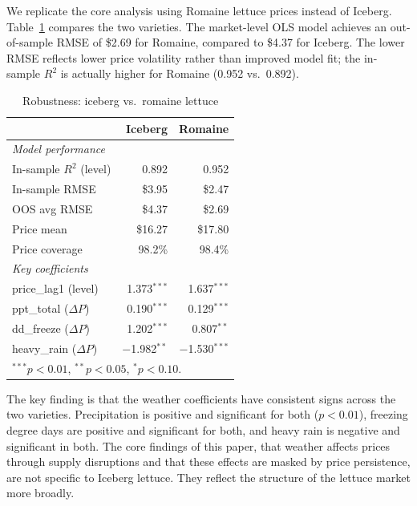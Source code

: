 \documentclass[12pt]{article}
\begin{document}
We replicate the core analysis using Romaine lettuce prices instead of Iceberg. Table~\ref{tab:romaine} compares the two varieties. The market-level OLS model achieves an out-of-sample RMSE of \$2.69 for Romaine, compared to \$4.37 for Iceberg. The lower RMSE reflects lower price volatility rather than improved model fit; the in-sample $R^2$ is actually higher for Romaine (0.952 vs.\ 0.892).

\begin{table}[!htbp]
\centering
\caption{Robustness: iceberg vs.\ romaine lettuce}
\label{tab:romaine}
\begin{tabular}{lrr}
\toprule
 & Iceberg & Romaine \\
\midrule
\textit{Model performance} \\
\quad In-sample $R^2$ (level) & 0.892 & 0.952 \\
\quad In-sample RMSE & \$3.95 & \$2.47 \\
\quad OOS avg RMSE & \$4.37 & \$2.69 \\
\quad Price mean & \$16.27 & \$17.80 \\
\quad Price coverage & 98.2\% & 98.4\% \\
\addlinespace
\textit{Key coefficients} \\
\quad price\_lag1 (level) & 1.373$^{***}$ & 1.637$^{***}$ \\
\quad ppt\_total ($\Delta P$) & 0.190$^{***}$ & 0.129$^{***}$ \\
\quad dd\_freeze ($\Delta P$) & 1.202$^{***}$ & 0.807$^{**}$ \\
\quad heavy\_rain ($\Delta P$) & $-$1.982$^{**}$ & $-$1.530$^{***}$ \\
\bottomrule
\multicolumn{3}{l}{\footnotesize $^{***}p<0.01$, $^{**}p<0.05$, $^{*}p<0.10$.} \\
\end{tabular}
\end{table}

The key finding is that the weather coefficients have consistent signs across the two varieties. Precipitation is positive and significant for both ($p < 0.01$), freezing degree days are positive and significant for both, and heavy rain is negative and significant in both. The core findings of this paper, that weather affects prices through supply disruptions and that these effects are masked by price persistence, are not specific to Iceberg lettuce. They reflect the structure of the lettuce market more broadly.

\end{document}
